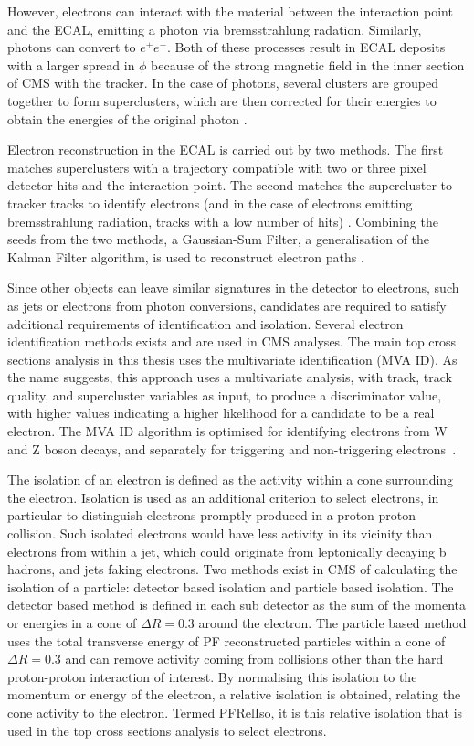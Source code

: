 However, electrons can interact with the material between the interaction point and the ECAL, emitting a
photon via bremsstrahlung radation. Similarly, photons can convert to $e^{+}e^{-}$. Both of these processes
result in ECAL deposits with a larger spread in $\phi$ because of the strong magnetic field in the inner
section of CMS with the tracker. In the case of photons, several clusters are grouped together to form superclusters,
which are then corrected for their energies to obtain the energies of the original photon
\cite{photon_reconstruction}.

Electron reconstruction in the ECAL is carried out by two methods. The first matches superclusters
with a trajectory compatible with two or three pixel detector hits and the interaction point. The second matches the
supercluster to tracker tracks to identify electrons (and in the case of electrons emitting bremsstrahlung
radiation, tracks with a low number of hits) \cite{electron_reconstruction}. Combining the seeds from the two
methods, a Gaussian-Sum Filter, a generalisation of the Kalman Filter algorithm, is used to reconstruct
electron paths \cite{electrons_GSF}.

Since other objects can leave similar signatures in the detector to electrons, such as jets or electrons from
photon conversions, candidates are required to satisfy additional requirements of identification and
isolation. Several electron identification methods exists and are used in CMS analyses. The main top cross
sections analysis in this thesis uses the multivariate identification (MVA ID). As the name suggests, this
approach uses a multivariate analysis, with track, track quality, and supercluster variables as input, to
produce a discriminator value, with higher values indicating a higher likelihood for a candidate to be a real
electron. The MVA ID algorithm is optimised for identifying electrons from W and Z boson decays, and
separately for triggering and non-triggering electrons~\cite{electron_reconstruction}.

The isolation of an electron is defined as the activity within a cone surrounding the electron. Isolation is
used as an additional criterion to select electrons, in particular to distinguish electrons promptly produced
in a proton-proton collision. Such isolated electrons would have less activity in its vicinity than electrons
from within a jet, which could originate from leptonically decaying b hadrons, and jets faking electrons. Two
methods exist in CMS of calculating the isolation of a particle: detector based isolation and particle based
isolation. The detector based method is defined in each sub detector as the sum of the momenta or energies in
a cone of $\Delta R = 0.3$ around the electron. The particle based method uses the total transverse energy of
PF reconstructed particles within a cone of $\Delta R = 0.3$ and can remove activity coming from collisions
other than the hard proton-proton interaction of interest. By normalising this isolation to the momentum or
energy of the electron, a relative isolation is obtained, relating the cone activity to the electron.
Termed PFRelIso, it is this relative isolation that is used in the top cross sections analysis to select
electrons.

